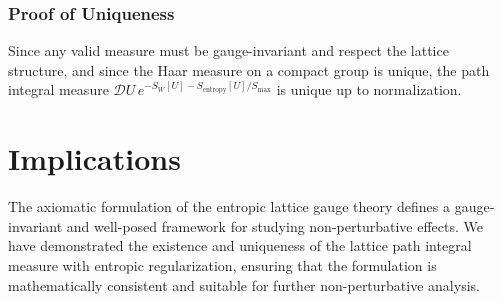 \subsubsection{Proof of Uniqueness}
Since any valid measure must be gauge-invariant and respect the lattice structure, and since the Haar measure on a compact group is unique, the path integral measure \(\mathcal{D}U \, e^{-S_W[U] - S_{\text{entropy}}[U]/S_{\text{max}}}\) is unique up to normalization.



\section{Implications}

The axiomatic formulation of the entropic lattice gauge theory defines a gauge-invariant and well-posed framework for studying non-perturbative effects. We have demonstrated the existence and uniqueness of the lattice path integral measure with entropic regularization, ensuring that the formulation is mathematically consistent and suitable for further non-perturbative analysis.
